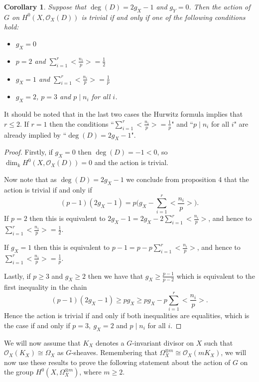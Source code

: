 \documentclass[11pt]{article} %
\newtheorem{cor}{Corollary}
\begin{document}
\begin{cor}
Suppose that $\deg(D)= 2g_X-1$ and $g_Y=0$. Then the action of $G$ on $H^0(X,\mathscr{O}_X(D))$ is 
trivial if and only if one of the following conditions hold:
	\begin{itemize}
		\item
			$g_X=0$
		\item
			$p=2$ and $\sum_{i=1}^r\Big<\frac{n_i}{p}\Big>=\frac{1}{2}$
		\item
			$g_X=1$ and $\sum_{i=1}^r\Big<\frac{n_i}{p}\Big>=\frac{1}{p}$
		\item
			$g_X=2$, $p=3$ and $p\mid n_i$ for all $i$.
	\end{itemize}
\end{cor}
It should be noted that in the last two cases the Hurwitz formula implies that $r\leq 2$. If $r=1$ then the conditions 
``$\sum_{i=1}^r\Big<\frac{n_i}{p}\Big>=\frac{1}{p}$" and ``$p\mid n_i$ for all $i$" are already implied by ``$\deg(D)=2g_X-1$".
\begin{proof}
Firstly, if $g_X=0$ then $\deg(D)=-1<0$, so $\dim_kH^0(X,\mathscr{O}_X(D))=0$ and the action is trivial.

Now note that as $\deg(D)=2g_X-1$ we conclude from proposition 4 that the action is trivial if and only if 
	\begin{equation*}
		(p-1)(2g_X-1)=p\Big(g_X-\sum_{i=1}^r\Big<\frac{n_i}{p}\Big>\Big).
	\end{equation*}
If $p=2$ then this is equivalent to $2g_X-1=2g_X-2\sum_{i=1}^r\Big<\frac{n_i}{p}\Big>$, and hence 
to $\sum_{i=1}^r\Big<\frac{n_i}{p}\Big>=\frac{1}{2}$.

If $g_X=1$ then this is equivalent to $p-1=p-p\sum_{i=1}^r\Big<\frac{n_i}{p}\Big>$, and hence 
to $\sum_{i=1}^r\Big<\frac{n_i}{p}\Big>=\frac{1}{p}$.

Lastly, if $p\geq 3$ and $g_X\geq 2$ then we have that $g_X\geq \frac{p-1}{p-2}$ which is equivalent 
to the first inequality in the chain
\begin{equation*}
	(p-1)(2g_X-1)\geq pg_X\geq pg_X-p\sum_{i=1}^r\Big<\frac{n_i}{p}\Big>.
\end{equation*}
Hence the action is trivial if and only if both inequalities are equalities, which is the case if and 
only if $p=3,\ g_X=2$ and $p\mid n_i$ for all $i$.
\end{proof}
We will now assume that $K_X$ denotes a $G$-invariant divisor on $X$ such that $\mathscr{O}_X(K_X)\cong \Omega_X$ 
as $G$-sheaves. Remembering that $\Omega_X^{\otimes m}\cong \mathscr{O}_X(mK_X)$, we will now use these results to prove 
the following statement about the action of $G$ on the group $H^0(X,\Omega_X^{\otimes m})$, where $m\geq 2$. \\
\end{document}
